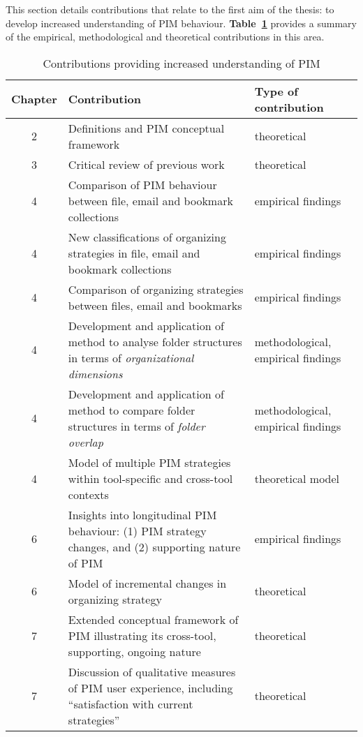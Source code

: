 This section details contributions that relate to the first aim of the thesis: to develop increased understanding of PIM behaviour.  \textbf{Table~\ref{table:conclusion:contributions:understanding}} provides a summary of the empirical, methodological and theoretical contributions in this area.

\begin{table}[hbtp]
\begin{center}
\begin{footnotesize}
\setlength{\extrarowheight}{2pt}
\begin{tabular}{|c|p{9cm}|p{3cm}|}
\hline
{\bf Chapter} & {\bf Contribution} & {\bf Type of contribution} \\
\hline
         2 & Definitions and PIM conceptual framework & theoretical \\
\hline
         3 & Critical review of previous work & theoretical \\
\hline
         4 & Comparison of PIM behaviour between file, email and bookmark collections & empirical findings \\
\hline
         4 & New classifications of organizing strategies in file, email and bookmark collections & empirical findings \\
\hline
         4 & Comparison of organizing strategies between files, email and bookmarks & empirical findings \\
\hline
         4 & Development and application of method to analyse folder structures in terms of \textit{organizational dimensions} & methodological, empirical findings \\
\hline
         4 & Development and application of method to compare folder structures in terms of \textit{folder overlap} & methodological, empirical findings \\
\hline
         4 & Model of multiple PIM strategies within tool-specific and cross-tool contexts & theoretical model \\
\hline
         6 & Insights into longitudinal PIM behaviour: (1) PIM strategy changes, and (2) supporting nature of PIM & empirical findings \\
\hline
         6 & Model of incremental changes in organizing strategy & theoretical \\
\hline
         7 & Extended conceptual framework of PIM illustrating its cross-tool, supporting, ongoing nature & theoretical \\
\hline
         7 & Discussion of qualitative measures of PIM user experience, including ``satisfaction with current strategies'' & theoretical \\
\hline
\end{tabular}  
\end{footnotesize}
\caption{Contributions providing increased understanding of PIM}
\label{table:conclusion:contributions:understanding}
\end{center}
\end{table}
\normalsize

